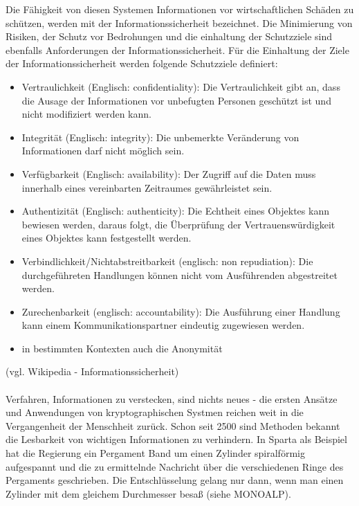 \documentclass[11pt,a4paper]{report}
\begin{document}
Die Fähigkeit von diesen Systemen Informationen vor wirtschaftlichen Schäden zu schützen, werden mit der Informationssicherheit bezeichnet. Die Minimierung von Risiken, der Schutz vor Bedrohungen und die einhaltung der Schutzziele sind ebenfalls Anforderungen der Informationssicherheit. Für die Einhaltung der Ziele der Informationssicherheit werden folgende Schutzziele definiert:

\begin{itemize}
\item Vertraulichkeit (Englisch: confidentiality): Die Vertraulichkeit gibt an, dass die Ausage der Informationen vor unbefugten Personen geschützt ist und nicht modifiziert werden kann.
\item Integrität (Englisch: integrity): Die unbemerkte Veränderung von Informationen darf nicht möglich sein.
\item Verfügbarkeit (Englisch: availability): Der Zugriff auf die Daten muss innerhalb eines vereinbarten Zeitraumes gewährleistet sein.
\item Authentizität (Englisch: authenticity): Die Echtheit eines Objektes kann bewiesen werden, daraus folgt, die Überprüfung der Vertrauenswürdigkeit eines Objektes kann festgestellt werden.
\item Verbindlichkeit/Nichtabstreitbarkeit (englisch: non repudiation): Die durchgeführeten Handlungen können nicht vom Ausführenden abgestreitet werden.
\item Zurechenbarkeit (englisch: accountability): Die Ausführung einer Handlung kann einem Kommunikationspartner eindeutig zugewiesen werden.
\item in bestimmten Kontexten auch die Anonymität
\end{itemize}

(vgl. Wikipedia - Informationssicherheit)\\\\

Verfahren, Informationen zu verstecken, sind nichts neues - die ersten Ansätze und Anwendungen von kryptographischen Systmen reichen weit in die Vergangenheit der Menschheit zurück. Schon seit 2500 sind Methoden bekannt die Lesbarkeit von wichtigen Informationen zu verhindern. In Sparta als Beispiel hat die Regierung ein Pergament Band um einen Zylinder spiralförmig aufgespannt und die zu ermittelnde Nachricht über die verschiedenen Ringe des Pergaments geschrieben. Die Entschlüsselung gelang nur dann, wenn man einen Zylinder mit dem gleichem Durchmesser besaß (siehe MONOALP).\\
\end{document}
